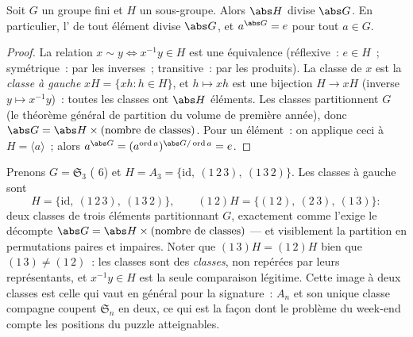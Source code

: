 \begin{theorem}[Lagrange]\label{thm:b2:structures:lagrange}
Soit $G$ un groupe fini et $H$ un sous-groupe. Alors $\abs H$ divise
$\abs G$. En particulier, l' de tout
élément divise $\abs G$, et $a^{\abs G} = e$ pour tout $a \in G$.
\end{theorem}

\begin{proof}
La relation $x \sim y \iff x^{-1}y \in H$ est une équivalence
(réflexive~: $e \in H$~; symétrique~: par les inverses~; transitive~:
par les produits). La classe de $x$ est la \emph{classe à gauche} $xH
= \{xh : h \in H\}$, et $h \mapsto xh$ est une bijection $H \to xH$
(inverse $y \mapsto x^{-1}y$)~: toutes les classes ont $\abs H$
éléments. Les classes partitionnent $G$ (le théorème général de
partition du volume de première année), donc $\abs G = \abs H \times
(\text{nombre de classes})$. Pour un élément~: on applique ceci à $H =
\langle a\rangle$~; alors $a^{\abs G} = (a^{\operatorname{ord}
a})^{\abs G / \operatorname{ord} a} = e$.
\end{proof}

\begin{example}\label{ex:b2:structures:cosets}
Prenons $G = \mathfrak{S}_3$ ( $6$) et $H = A_3 =
\{\mathrm{id},\ (1\,2\,3),\ (1\,3\,2)\}$. Les classes à gauche sont
\[
H = \{\mathrm{id},\ (1\,2\,3),\ (1\,3\,2)\},
\qquad
(1\,2)H = \{(1\,2),\ (2\,3),\ (1\,3)\} :
\]
deux classes de trois éléments partitionnant $G$, exactement comme
l'exige le décompte $\abs G = \abs H \times (\text{nombre de
classes})$ --- et visiblement la partition en permutations paires
et impaires. Noter que $(1\,3)H = (1\,2)H$ bien que $(1\,3) \neq
(1\,2)$~: les classes sont des \emph{classes}, non repérées par
leurs représentants, et $x^{-1}y \in H$ est la seule comparaison
légitime. Cette image à deux classes est celle qui vaut en général
pour la signature~: $A_n$ et son unique classe compagne coupent
$\mathfrak{S}_n$ en deux, ce qui est la façon dont le problème du
week-end compte les positions du puzzle atteignables.
\end{example}

